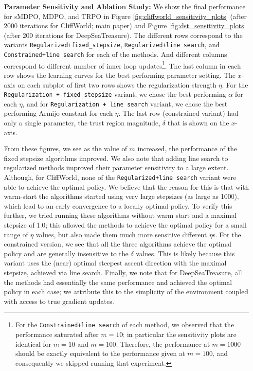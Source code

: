 \documentclass[a4paper, 10pt]{article}
\begin{document}
\textbf{Parameter Sensitivity and Ablation Study:} We show the final performance for sMDPO, MDPO, and TRPO in Figure \ref{fig:cliffworld_sensitivity_plots} (after 2000 iterations for CliffWorld; main paper) and Figure \ref{fig:dst_sensitivity_plots} (after 200 iterations for DeepSeaTreasure). The different rows correspond to the variants \texttt{Regularized+fixed_stepsize}, \texttt{Regularized+line search}, and \texttt{Constrained+line search} for each of the methods. And different columns correspond to different number of inner loop updates\footnote{For the \texttt{Constrained+line search} of each method, we observed that the performance saturated after $m = 10$; in particular the sensitivity plots are identical for $m=10$ and $m=100$. Therefore, the performance at $m=1000$ should be exactly equivalent to the performance given at $m=100$, and consequently we skipped running that experiment.}. The last column in each row shows the learning curves for the best performing parameter setting. The $x$-axis on each subplot of first two rows shows the regularization strength $\eta$. For the \texttt{Regularization + fixed stepsize} variant, we chose the best performing $\alpha$ for each $\eta$, and for \texttt{Regularization + line search} variant, we chose the best performing Armijo constant for each $\eta$. The last row (constrained variant) had only a single parameter, the trust region magnitude, $\delta$ that is shown on the $x$-axis.

From these figures, we see as the value of $m$ increased, the performance of  the fixed stepsize algorithms improved. We also note that adding line search to regularized methods improved their parameter sensitivity to a large extent. Although, for CliffWorld, none of the \texttt{Regularized+line search} variant were able to achieve the optimal policy. We believe that the reason for this is that with warm-start the algorithms started using very large stepsizes (as large as 1000), which lead to an early convergence to a locally optimal policy. To verify this further, we tried running these algorithms without warm start and a maximal stepsize of 1.0; this allowed the methods to achieve the optimal policy for a small range of $\eta$ values, but also made them much more sensitive different $\eta$s. For the constrained version, we see that all the three algorithms achieve the optimal policy and are generally insensitive to the $\delta$ values. This is likely because this variant uses the (near) optimal steepest ascent direction with the maximal stepsize, achieved via line search. Finally, we note that for DeepSeaTreasure, all the methods had essentially the same performance and achieved the optimal policy in each case; we attribute this to the simplicity of the environment coupled with access to true gradient updates.
\end{document}
